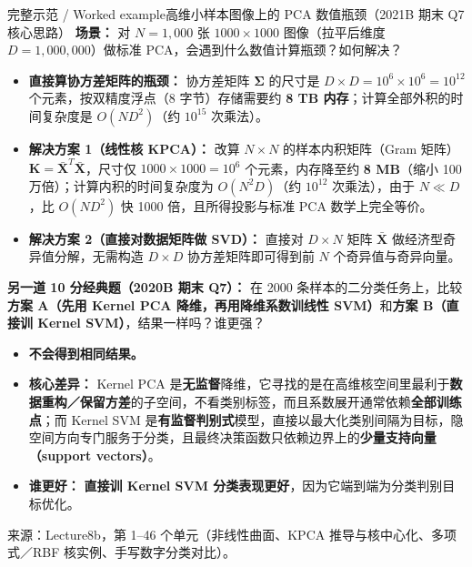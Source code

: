 \begin{StudyBlock}{完整示范 / Worked example}{高维小样本图像上的 PCA 数值瓶颈（2021B 期末 Q7 核心思路）}
\textbf{场景：} 对 $N = 1{,}000$ 张 $1000\times 1000$ 图像（拉平后维度 $D = 1{,}000{,}000$）做标准 PCA，会遇到什么数值计算瓶颈？如何解决？
\begin{itemize}
\item \textbf{直接算协方差矩阵的瓶颈：} 协方差矩阵 $\boldsymbol{\Sigma}$ 的尺寸是 $D\times D = 10^6\times 10^6 = 10^{12}$ 个元素，按双精度浮点（8 字节）存储需要约 \textbf{8 TB 内存}；计算全部外积的时间复杂度是 $O(N D^2)$（约 $10^{15}$ 次乘法）。
\item \textbf{解决方案 1（线性核 KPCA）：} 改算 $N\times N$ 的样本内积矩阵（Gram 矩阵）$\mathbf{K}=\bar{\mathbf{X}}^T\bar{\mathbf{X}}$，尺寸仅 $1000\times 1000 = 10^6$ 个元素，内存降至约 \textbf{8 MB}（缩小 100 万倍）；计算内积的时间复杂度为 $O(N^2 D)$（约 $10^{12}$ 次乘法），由于 $N \ll D$，比 $O(N D^2)$ 快 1000 倍，且所得投影与标准 PCA 数学上完全等价。
\item \textbf{解决方案 2（直接对数据矩阵做 SVD）：} 直接对 $D\times N$ 矩阵 $\bar{\mathbf{X}}$ 做经济型奇异值分解，无需构造 $D\times D$ 协方差矩阵即可得到前 $N$ 个奇异值与奇异向量。
\end{itemize}
\end{StudyBlock}

\textbf{另一道 10 分经典题（2020B 期末 Q7）：} 在 2000 条样本的二分类任务上，比较\textbf{方案 A（先用 Kernel PCA 降维，再用降维系数训线性 SVM）}和\textbf{方案 B（直接训 Kernel SVM）}，结果一样吗？谁更强？
\begin{itemize}
\item \textbf{不会得到相同结果。}
\item \textbf{核心差异：} Kernel PCA 是\textbf{无监督}降维，它寻找的是在高维核空间里最利于\textbf{数据重构／保留方差}的子空间，不看类别标签，而且系数展开通常依赖\textbf{全部训练点}；而 Kernel SVM 是\textbf{有监督判别式}模型，直接以最大化类别间隔为目标，隐空间方向专门服务于分类，且最终决策函数只依赖边界上的\textbf{少量支持向量（support vectors）}。
\item \textbf{谁更好：} \textbf{直接训 Kernel SVM 分类表现更好}，因为它端到端为分类判别目标优化。
\end{itemize}

来源：Lecture8b，第 1–46 个单元（非线性曲面、KPCA 推导与核中心化、多项式／RBF 核实例、手写数字分类对比）。



